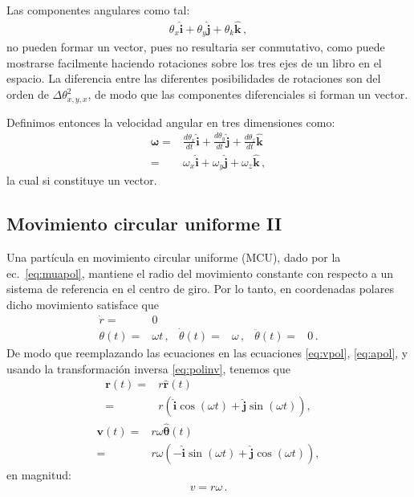 Las componentes angulares como tal:
\begin{align*}
  \theta_x\hat{\mathbf{i}}+\theta_y\hat{\mathbf{j}}+\theta_k\hat{\mathbf{k}}\,,
\end{align*}
no pueden formar un vector, pues no resultaria ser conmutativo, como
puede mostrarse facilmente haciendo rotaciones sobre los tres ejes de
un libro en el espacio. La diferencia entre las diferentes
posibilidades de rotaciones son del orden de $\Delta
\theta_{x,y,x}^2$, de modo que las componentes diferenciales si forman
un vector. 

Definimos entonces la velocidad angular en tres dimensiones como:
\begin{align}
  \boldsymbol{\omega}=&\frac{d\theta_x}{dt}\hat{\mathbf{i}}+\frac{d\theta_y}{dt}\hat{\mathbf{j}}
+\frac{d\theta_z}{dt}\hat{\mathbf{k}}\nonumber\\
=&\omega_x\hat{\mathbf{i}}+\omega_y\hat{\mathbf{j}}+\omega_z\hat{\mathbf{k}}\,,
\end{align}
la cual si constituye un vector.

\subsection{Movimiento circular uniforme II}


Una partícula en movimiento circular uniforme (MCU), dado por la ec.~\eqref{eq:muapol}, mantiene el radio del movimiento constante con respecto a un sistema de referencia en el centro de giro. Por lo tanto, en coordenadas polares dicho movimiento satisface que
\begin{align}
  \label{eq:muapol}
   \dot{r}=&0&&&&\\
  \theta(t)=&\omega t\,,&\dot{\theta}(t)=&\omega\,,&\ddot{\theta}(t)=&0\,.
\end{align}
De modo que reemplazando las ecuaciones  en las ecuaciones \eqref{eq:vpol}, \eqref{eq:apol}, y usando la transformaci\'on inversa \eqref{eq:polinv}, tenemos que
\begin{align}
  \mathbf{r}(t)=&r\hat{\mathbf{r}}(t)\nonumber\\
  =&r\left(\hat{\mathbf{i}}\cos(\omega t)+\hat{\mathbf{j}}\sin(\omega t)\right),
\end{align}
\begin{align}
    \mathbf{v}(t)=&r\omega\hat{\boldsymbol{\theta}}(t)\nonumber\\
    =&r\omega\left(-\hat{\mathbf{i}}\sin(\omega t)+\hat{\mathbf{j}}\cos(\omega t)\right),
\end{align}
en magnitud:
\begin{align}
  \label{eq:vome}
  v=r\omega\,.
\end{align}

